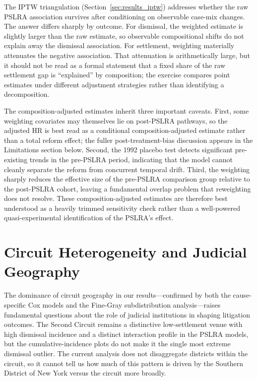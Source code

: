 The IPTW triangulation (Section~\ref{sec:results_iptw})
addresses whether the raw PSLRA association survives after
conditioning on observable case-mix changes. The answer
differs sharply by outcome. For dismissal, the weighted
estimate is slightly larger than the raw estimate, so
observable compositional shifts do not explain away the
dismissal association. For settlement, weighting materially
attenuates the negative association. That attenuation is
arithmetically large, but it should not be read as a formal
statement that a fixed share of the raw settlement gap is
``explained'' by composition; the exercise compares point
estimates under different adjustment strategies rather than
identifying a decomposition.

The composition-adjusted estimates inherit three important
caveats. First, some weighting covariates may themselves lie
on post-PSLRA pathways, so the adjusted HR is best read as a
conditional composition-adjusted estimate rather than a
total reform effect; the fuller post-treatment-bias
discussion appears in the Limitations section below.
Second, the 1992 placebo test detects significant
pre-existing trends in the pre-PSLRA period, indicating that
the model cannot cleanly separate the reform from concurrent
temporal drift. Third, the
weighting sharply reduces the effective size of the pre-PSLRA
comparison group relative to the post-PSLRA cohort, leaving a
fundamental overlap problem that reweighting does not
resolve. These composition-adjusted estimates are therefore
best understood as a heavily trimmed sensitivity check rather
than a well-powered quasi-experimental identification of the
PSLRA's effect.

\section{Circuit Heterogeneity and Judicial Geography}

The dominance of circuit geography in our results---confirmed
by both the cause-specific Cox models and the Fine-Gray
subdistribution analysis---raises fundamental questions
about the role of judicial institutions in shaping litigation
outcomes. The Second Circuit remains a distinctive
low-settlement venue with high dismissal incidence and a
distinct interaction profile in the PSLRA models, but the
cumulative-incidence plots do not make it the single most
extreme dismissal outlier. The current analysis does not
disaggregate districts within the circuit, so it cannot tell
us how much of this pattern is driven by the Southern
District of New York versus the circuit more broadly.


